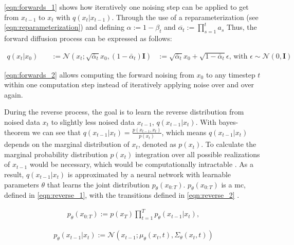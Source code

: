 \autoref{eqn:forwards_1} \cite{ho2020DenoisingDiffusionProbabilistic} shows how iteratively one noising step can be applied to get from $x_{t-1}$ to $x_t$ with $q(x_t | x_{t-1})$.
Through the use of a reparameterization (see \autoref{eqn:reparameterization}) and defining $\alpha := 1-\beta_t$ and $\overline{\alpha_t}:=\prod_{s=1}^{t}a_s$
Thus, the forward diffusion process can be expressed as follows:

\begin{equation}
  \label{eqn:forwards_2}
  \begin{align*}
    q(x_t | x_0) \quad & := \mathcal{N}(x_t; \sqrt{\bar{\alpha}_t} x_0, (1 - \bar{\alpha}_t) \textbf{I})
     &:= \sqrt{\bar{\alpha}_t} x_0 + \sqrt{1 - \bar{\alpha}_t} \epsilon \textrm{, with } \epsilon\sim\mathcal{N}(0, \textbf{I})
  \end{align*}
\end{equation}

\autoref{eqn:forwards_2}\cite{ho2020DenoisingDiffusionProbabilistic} allows computing the forward noising from $x_0$ to any timestep $t$ within one computation step instead of iteratively applying noise over and over again.

During the reverse process, the goal is to learn the reverse distribution from noised data $x_t$ to slightly less noised data $x_{t-1}$, $q(x_{t-1}|x_t)$.
With bayes-theorem we can see that $q(x_{t-1}|x_t) = \frac{p(x_{t-1},x_t)}{p(x_t)}$, which means $q(x_{t-1}|x_t)$ depends on the marginal distribution of $x_t$, denoted as $p(x_t)$.
To calculate the marginal probability distribution $p(x_t)$ integration over all possible realizations of $x_{t-1}$ would be necessary, which would be computationally intractable \cite{capel2022MasterThesisDenoising}.
As a result, $q(x_{t-1}|x_t)$ is approximated by a neural network with learnable parameters $\theta$ that learns the joint distribution $p_{\theta}(x_{0:T})$.
$p_{\theta}(x_{0:T})$ is a \gls{mc}, defined in \autoref{eqn:reverse_1}, with the transitions defined in \autoref{eqn:reverse_2} \cite{capel2022MasterThesisDenoising, ho2020DenoisingDiffusionProbabilistic}.

\begin{equation}
  \label{eqn:reverse_1}
  \begin{align*}
    p_{\theta}(x_{0:T}) := p(x_T) \prod_{t=1}^T p_{\theta}(x_{t-1} | x_t),
  \end{align*}
\end{equation}

\begin{equation}
  \label{eqn:reverse_2}
  \begin{align*}
    p_{\theta}(x_{t-1}|x_t) := \mathcal{N}(x_{t-1}; \mu_{\theta}(x_t, t), \Sigma_{\theta}(x_t, t))
  \end{align*}
\end{equation}
    
